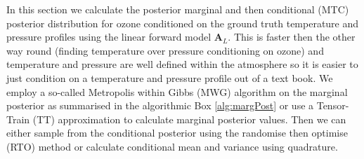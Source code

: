 In this section we calculate the posterior marginal and then conditional (MTC) posterior distribution for ozone conditioned on the ground truth temperature and pressure profiles using the linear forward model $\bm{A}_L$.
This is faster then the other way round (finding temperature over pressure conditioning on ozone) and temperature and pressure are well defined within the atmosphere so it is easier to just condition on a temperature and pressure profile out of a text book.
We employ a so-called Metropolis within Gibbs (MWG) algorithm on the marginal posterior as summarised in the algorithmic Box \ref{alg:margPost} or use a Tensor-Train (TT) approximation to calculate marginal posterior values.
Then we can either sample from the conditional posterior using the randomise then optimise (RTO) method or calculate conditional mean and variance using quadrature.

